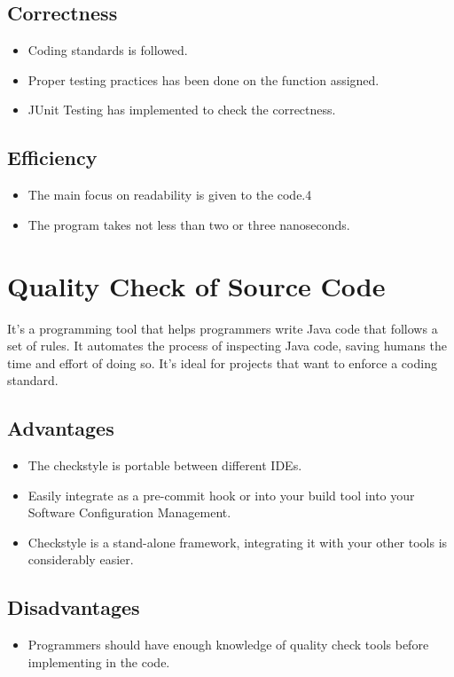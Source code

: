 \documentclass[a4paper,12pt]{article}
\begin{document}
    \subsection{Correctness}
        \begin{itemize}
            \item Coding standards is followed.
            \item Proper testing practices has been done on the function assigned. 
            \item JUnit Testing has implemented to check the correctness. 
        \end{itemize}
    
   
    \subsection{Efficiency}
    \begin{itemize}
        \item The main focus on readability is given to the code.4
        \item The program takes not less than two or three nanoseconds.
    \end{itemize}
    
    \section{Quality Check of Source Code}
    It's a programming tool that helps programmers write Java code that follows a set of rules. It automates the process of inspecting Java code, saving humans the time and effort of doing so. It's ideal for projects that want to enforce a coding standard.
    \subsection{Advantages}
    \begin{itemize}
        \item The checkstyle is portable between different IDEs.
        \item Easily integrate as a pre-commit hook or into your build tool into your Software Configuration Management.
        \item Checkstyle is a stand-alone framework, integrating it with your other tools is considerably easier.
    \end{itemize}
    \subsection{Disadvantages}
    \begin{itemize}
        \item Programmers should have enough knowledge of quality check tools before implementing in the code.
    \end{itemize}
\end{document}
